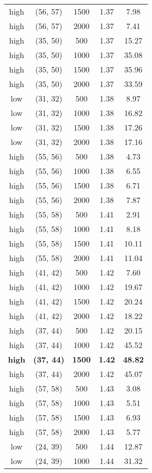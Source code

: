 \begin{tabular}{c c c c c}
high & (56, 57) &  1500 & 1.37 & 7.98 \\
high & (56, 57) &  2000 & 1.37 & 7.41 \\
high & (35, 50) &  500 & 1.37 & 15.27 \\
high & (35, 50) &  1000 & 1.37 & 35.08 \\
high & (35, 50) &  1500 & 1.37 & 35.96 \\
high & (35, 50) &  2000 & 1.37 & 33.59 \\
low & (31, 32) &  500 & 1.38 & 8.97 \\
low & (31, 32) &  1000 & 1.38 & 16.82 \\
low & (31, 32) &  1500 & 1.38 & 17.26 \\
low & (31, 32) &  2000 & 1.38 & 17.16 \\
high & (55, 56) &  500 & 1.38 & 4.73 \\
high & (55, 56) &  1000 & 1.38 & 6.55 \\
high & (55, 56) &  1500 & 1.38 & 6.71 \\
high & (55, 56) &  2000 & 1.38 & 7.87 \\
high & (55, 58) &  500 & 1.41 & 2.91 \\
high & (55, 58) &  1000 & 1.41 & 8.18 \\
high & (55, 58) &  1500 & 1.41 & 10.11 \\
high & (55, 58) &  2000 & 1.41 & 11.04 \\
high & (41, 42) &  500 & 1.42 & 7.60 \\
high & (41, 42) &  1000 & 1.42 & 19.67 \\
high & (41, 42) &  1500 & 1.42 & 20.24 \\
high & (41, 42) &  2000 & 1.42 & 18.22 \\
high & (37, 44) &  500 & 1.42 & 20.15 \\
high & (37, 44) &  1000 & 1.42 & 45.52 \\
\textbf{high} & \textbf{(37, 44)} & \textbf{ 1500} & \textbf{1.42} & \textbf{48.82} \\
high & (37, 44) &  2000 & 1.42 & 45.07 \\
high & (57, 58) &  500 & 1.43 & 3.08 \\
high & (57, 58) &  1000 & 1.43 & 5.51 \\
high & (57, 58) &  1500 & 1.43 & 6.93 \\
high & (57, 58) &  2000 & 1.43 & 5.77 \\
low & (24, 39) &  500 & 1.44 & 12.87 \\
low & (24, 39) &  1000 & 1.44 & 31.32 \\

\end{tabular}
